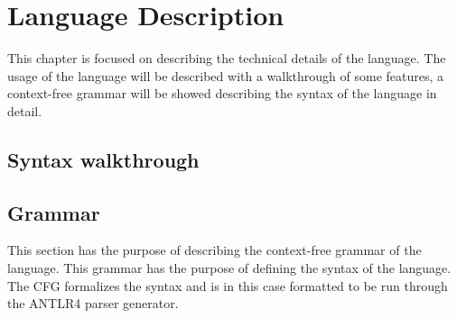 \chapter{Language Description}
\label{chap:LanguageDescription}
This chapter is focused on describing the technical details of the language. The usage of the language will be described with a walkthrough of some features, a context-free grammar will be showed describing the syntax of the language in detail. 

\section{Syntax walkthrough}

\section{Grammar}
\label{sec:Grammar}
This section has the purpose of describing the context-free grammar of the language. This grammar has the purpose of defining the syntax of the language. The CFG formalizes the syntax and is in this case formatted to be run through the ANTLR4 parser generator.

